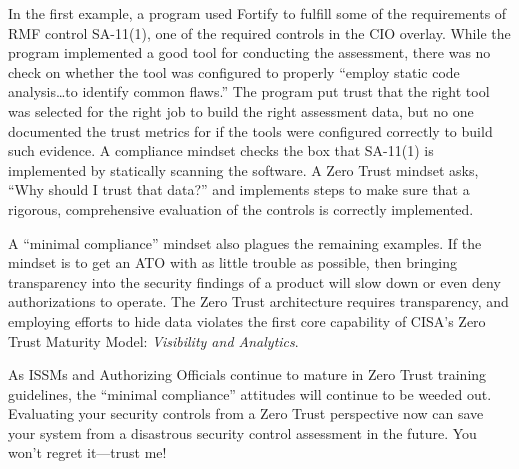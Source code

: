In the first example, a program used Fortify to fulfill some of the requirements of RMF control SA-11(1), one of the required controls in the CIO overlay. While the program implemented a good tool for conducting the assessment, there was no check on whether the tool was configured to properly ``employ static code analysis\ldots to identify common flaws.'' The program put trust that the right tool was selected for the right job to build the right assessment data, but no one documented the trust metrics for if the tools were configured correctly to build such evidence. A compliance mindset checks the box that SA-11(1) is implemented by statically scanning the software. A Zero Trust mindset asks, ``Why should I trust that data?'' and implements steps to make sure that a rigorous, comprehensive evaluation of the controls is correctly implemented.\autocite{20240610:nist800207}

A ``minimal compliance'' mindset also plagues the remaining examples. If the mindset is to get an ATO with as little trouble as possible, then bringing transparency into the security findings of a product will slow down or even deny authorizations to operate. The Zero Trust architecture requires transparency, and employing efforts to hide data violates the first core capability of CISA's Zero Trust Maturity Model: \textit{Visibility and Analytics}.\autocite{20240610:cisa} 

As ISSMs and Authorizing Officials continue to mature in Zero Trust training guidelines, the ``minimal compliance'' attitudes will continue to be weeded out. Evaluating your security controls from a Zero Trust perspective now can save your system from a disastrous security control assessment in the future. You won't regret it---trust me!
